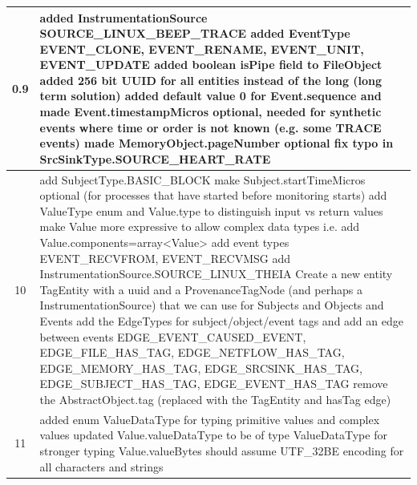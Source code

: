 \documentclass[10pt, conference, onecolumn]{IEEEtran}
\begin{document}
\begin{longtable}{|c|p{17cm}|}
\\\hline
0.9 & \small
  added InstrumentationSource SOURCE\_LINUX\_BEEP\_TRACE \newline
  added EventType EVENT\_CLONE, EVENT\_RENAME, EVENT\_UNIT, EVENT\_UPDATE \newline
 added boolean isPipe field to FileObject \newline
  added 256 bit UUID for all entities instead of the long (long term solution) \newline
  added default value 0 for Event.sequence and made Event.timestampMicros optional, needed for synthetic events
   where time or order is not known (e.g. some TRACE events) \newline
  made MemoryObject.pageNumber optional \newline
  fix typo in SrcSinkType.SOURCE\_HEART\_RATE 
\\\hline
10 & \small
  add SubjectType.BASIC\_BLOCK \newline
  make Subject.startTimeMicros optional (for processes that have started before monitoring starts) \newline
  add ValueType enum and Value.type to distinguish input vs return values \newline
  make Value more expressive to allow complex data types i.e. add Value.components=array<Value> \newline
  add event types EVENT\_RECVFROM, EVENT\_RECVMSG \newline
  add InstrumentationSource.SOURCE\_LINUX\_THEIA \newline
  Create a new entity TagEntity with a uuid and a ProvenanceTagNode (and perhaps a InstrumentationSource)
   that we can use for Subjects and Objects and Events \newline
  add the EdgeTypes for subject/object/event tags and add an edge between events \newline
  EDGE\_EVENT\_CAUSED\_EVENT, EDGE\_FILE\_HAS\_TAG, EDGE\_NETFLOW\_HAS\_TAG, EDGE\_MEMORY\_HAS\_TAG, 
  EDGE\_SRCSINK\_HAS\_TAG, EDGE\_SUBJECT\_HAS\_TAG, EDGE\_EVENT\_HAS\_TAG \newline
  remove the AbstractObject.tag (replaced with the TagEntity and hasTag edge)
\\\hline
11 & \small
   added enum ValueDataType for typing primitive values and complex values \newline
   updated Value.valueDataType to be of type ValueDataType for stronger typing \newline
   Value.valueBytes should assume UTF\_32BE encoding for all characters and strings \newline

\end{longtable}
\end{document}
